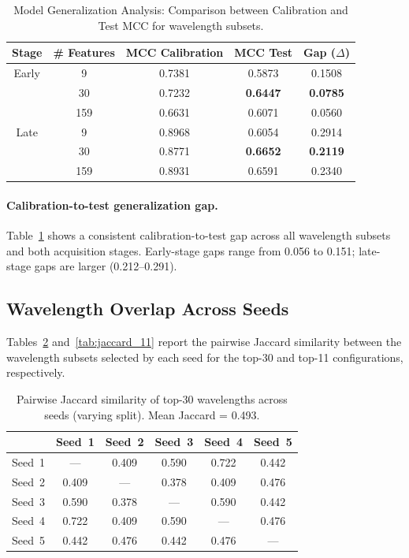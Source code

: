\begin{table}[!htbp]
\centering
\caption[Model generalization: calibration vs.\ test MCC]{Model Generalization Analysis: Comparison between Calibration and Test MCC for wavelength subsets.}
\label{tab:mcc_generalization}
\begin{tabular}{ccccc}
\toprule
Stage & \# Features & MCC Calibration & MCC Test & \textbf{Gap ($\Delta$)} \\
\midrule
Early & 9   & 0.7381 & 0.5873 & 0.1508 \\
      & 30  & 0.7232 & \textbf{0.6447} & \textbf{0.0785} \\
      & 159 & 0.6631 & 0.6071 & 0.0560 \\
\midrule
Late  & 9   & 0.8968 & 0.6054 & 0.2914 \\
      & 30  & 0.8771 & \textbf{0.6652} & \textbf{0.2119} \\
      & 159 & 0.8931 & 0.6591 & 0.2340 \\
\bottomrule
\end{tabular}
\end{table}

\paragraph{Calibration-to-test generalization gap.}
Table~\ref{tab:mcc_generalization} shows a consistent calibration-to-test gap across all wavelength subsets and both acquisition stages. Early-stage gaps range from 0.056 to 0.151; late-stage gaps are larger (0.212--0.291).

\subsection{Wavelength Overlap Across Seeds}

\noindent
Tables~\ref{tab:jaccard_30} and~\ref{tab:jaccard_11} report the pairwise Jaccard similarity between the wavelength subsets selected by each seed for the top-30 and top-11 configurations, respectively.

\begin{table}[!htbp]
\centering
\caption[Jaccard similarity: top-30, varying split]{Pairwise Jaccard similarity of top-30 wavelengths across seeds (varying split). Mean Jaccard = 0.493.}
\label{tab:jaccard_30}
\begin{tabular}{cccccc}
\toprule
 & Seed~1 & Seed~2 & Seed~3 & Seed~4 & Seed~5 \\
\midrule
Seed~1 & ---   & 0.409 & 0.590 & 0.722 & 0.442 \\
Seed~2 & 0.409 & ---   & 0.378 & 0.409 & 0.476 \\
Seed~3 & 0.590 & 0.378 & ---   & 0.590 & 0.442 \\
Seed~4 & 0.722 & 0.409 & 0.590 & ---   & 0.476 \\
Seed~5 & 0.442 & 0.476 & 0.442 & 0.476 & ---   \\
\bottomrule
\end{tabular}
\end{table}


